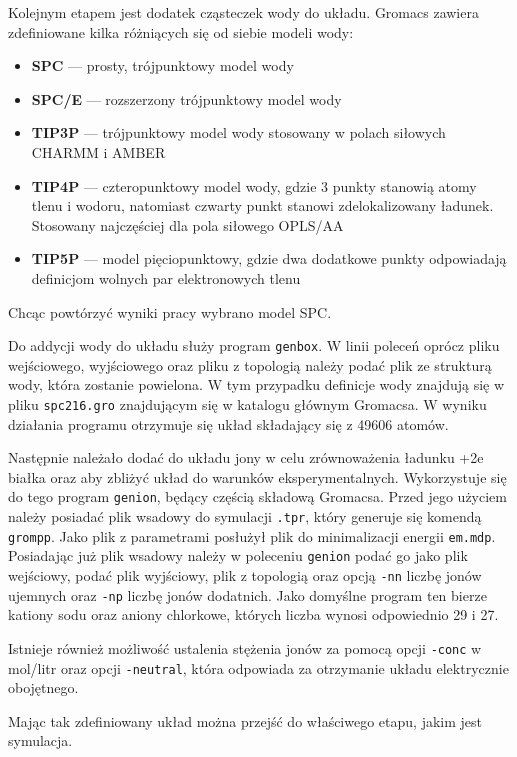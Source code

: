 Kolejnym etapem jest dodatek cząsteczek wody do układu. Gromacs zawiera zdefiniowane kilka różniących się od siebie modeli wody:
\begin{itemize}
\item \textbf{SPC} --- prosty, trójpunktowy model wody
\item \textbf{SPC/E} --- rozszerzony trójpunktowy model wody
\item \textbf{TIP3P} --- trójpunktowy model wody stosowany w polach siłowych CHARMM i AMBER
\item \textbf{TIP4P} --- czteropunktowy model wody, gdzie 3 punkty stanowią atomy tlenu i wodoru, natomiast czwarty punkt stanowi zdelokalizowany ładunek. Stosowany najczęściej dla pola siłowego OPLS/AA
\item \textbf{TIP5P} --- model pięciopunktowy, gdzie dwa dodatkowe punkty odpowiadają definicjom wolnych par elektronowych tlenu
\end{itemize}
Chcąc powtórzyć wyniki pracy \cite{1tki} wybrano model SPC.

Do addycji wody do układu służy program \texttt{genbox}. W linii poleceń oprócz pliku wejściowego, wyjściowego oraz pliku z topologią należy podać plik ze strukturą wody, która zostanie powielona. W tym przypadku definicje wody znajdują się w pliku \texttt{spc216.gro} znajdującym się w katalogu głównym Gromacsa. W wyniku działania programu otrzymuje się układ składający się z 49606 atomów. 

Następnie należało dodać do układu jony w celu zrównoważenia ładunku +2e białka oraz aby zbliżyć układ do warunków eksperymentalnych. Wykorzystuje się do tego program \texttt{genion}, będący częścią składową Gromacsa. Przed jego użyciem należy posiadać plik wsadowy do symulacji \texttt{.tpr}, który generuje się komendą \texttt{grompp}. Jako plik z parametrami posłużył plik do minimalizacji energii \texttt{em.mdp}. Posiadając już plik wsadowy należy w poleceniu \texttt{genion} podać go jako plik wejściowy, podać plik wyjściowy, plik z topologią oraz opcją \texttt{-nn} liczbę jonów ujemnych oraz \texttt{-np} liczbę jonów dodatnich. Jako domyślne program ten bierze kationy sodu oraz aniony chlorkowe, których liczba wynosi odpowiednio 29 i 27.

Istnieje również możliwość ustalenia stężenia jonów za pomocą opcji \texttt{-conc} w mol/litr oraz opcji \texttt{-neutral}, która odpowiada za otrzymanie układu elektrycznie obojętnego.

Mając tak zdefiniowany układ można przejść do właściwego etapu, jakim jest symulacja.

